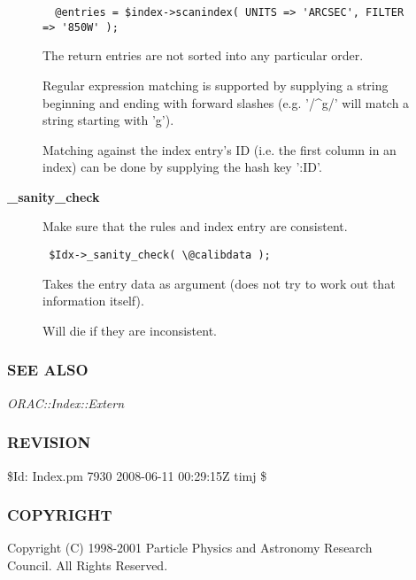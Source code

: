 \begin{description}
\begin{description}
\begin{verbatim}
  @entries = $index->scanindex( UNITS => 'ARCSEC', FILTER => '850W' );
\end{verbatim}


The return entries are not sorted into any particular order.



Regular expression matching is supported by supplying a string
beginning and ending with forward slashes (e.g. '/\^{}g/' will match a
string starting with 'g').



Matching against the index entry's ID (i.e. the first column in an
index) can be done by supplying the hash key ':ID'.


\item[{\textbf{\_sanity\_check}}] \mbox{}

Make sure that the rules and index entry are consistent.

\begin{verbatim}
 $Idx->_sanity_check( \@calibdata );
\end{verbatim}


Takes the entry data as argument (does not try to 
work out that information itself).



Will die if they are inconsistent.

\end{description}
\subsubsection*{SEE ALSO\label{ORAC::Index_SEE_ALSO}}


\emph{ORAC::Index::Extern}

\subsubsection*{REVISION\label{ORAC::Index_REVISION}}


\$Id: Index.pm 7930 2008-06-11 00:29:15Z timj \$

\subsubsection*{COPYRIGHT\label{ORAC::Index_COPYRIGHT}}


Copyright (C) 1998-2001 Particle Physics and Astronomy Research
Council. All Rights Reserved.


\end{description}
